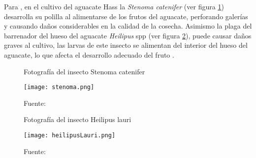 Para \citet{carabali2022}, en el cultivo del aguacate Hass la \textit{Stenoma catenifer} (ver figura \ref{fig:figuraStenoma}) desarrolla su polilla al alimentarse de los frutos del aguacate, perforando galerías y causando daños considerables en la calidad de la cosecha. Asimismo la plaga del barrenador del hueso del aguacate \textit{Heilipus} spp (ver figura \ref{fig:figuraHeilipus}), puede causar daños graves al cultivo, las  larvas de este insecto se alimentan del interior del hueso del aguacate, lo que afecta el desarrollo adecuado del fruto \citep{carabali2022}.

\begin{figure}[h]
\centering
\caption{Fotografía del insecto Stenoma catenifer}
\texttt{[image: stenoma.png]}
\caption*{\footnotesize Fuente: \cite{diaz2017}}
\label{fig:figuraStenoma}
\end{figure}

\begin{figure}[h]
\centering
\caption{Fotografía del insecto Heilipus lauri}
\texttt{[image: heilipusLauri.png]}
\caption*{\footnotesize Fuente: \cite{palacios2011}}
\label{fig:figuraHeilipus}
\end{figure}